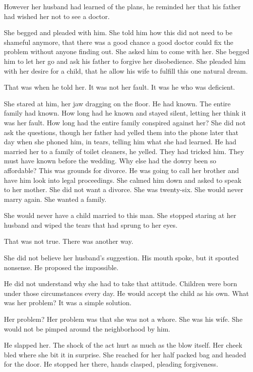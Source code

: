 \documentclass{article}
\begin{document}
However her husband had learned of the plans, he reminded her that his father had wished her not to see a doctor. 

She begged and pleaded with him. She told him how this did not need to be shameful anymore, that there was a good chance a good doctor could fix the problem without anyone finding out. She asked him to come with her. She begged him to let her go and ask his father to forgive her disobedience. She pleaded him with her desire for a child, that he allow his wife to fulfill this one natural dream. 

That was when he told her. It was not her fault. It was he who was deficient. 

She stared at him, her jaw dragging on the floor. He had known. The entire family had known. How long had he known and stayed silent, letting her think it was her fault. How long had the entire family conspired against her? She did not ask the questions, though her father had yelled them into the phone later that day when she phoned him, in tears, telling him what she had learned. He had married her to a family of toilet cleaners, he yelled. They had tricked him. They must have known before the wedding. Why else had the dowry been so affordable? This was grounds for divorce. He was going to call her brother and have him look into legal proceedings. She calmed him down and asked to speak to her mother. She did not want a divorce. She was twenty-six. She would never marry again. She wanted a family.

She would never have a child married to this man. She stopped staring at her husband and wiped the tears that had sprung to her eyes.

That was not true. There was another way. 

She did not believe her husband's suggestion. His mouth spoke, but it spouted nonsense. He proposed the impossible.

He did not  understand why she had to take that attitude. Children were born under those circumstances every day. He would accept the child as his own. What was her problem? It was a simple solution.

Her problem? Her problem was that she was not a whore. She was his wife. She would not be pimped around the neighborhood by him.

He slapped her. The shock of the act hurt as much as the blow itself. Her cheek bled where she bit it in surprise. She reached for her half packed bag and headed for the door. He stopped her there, hands clasped, pleading forgiveness. 
\end{document}
